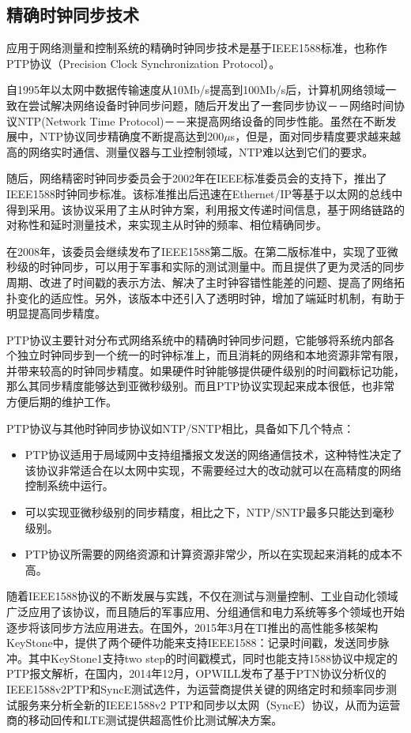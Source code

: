 \subsection{精确时钟同步技术}
应用于网络测量和控制系统的精确时钟同步技术是基于IEEE1588标准，也称作PTP协议（Precision Clock Synchronization Protocol）。

自1995年以太网中数据传输速度从10Mb/s提高到100Mb/s后，计算机网络领域一致在尝试解决网络设备时钟同步问题，随后开发出了一套同步协议－－网络时间协议NTP(Network Time Protocol)－－来提高网络设备的同步性能。虽然在不断发展中，NTP协议同步精确度不断提高达到200$\mu$s，但是，面对同步精度要求越来越高的网络实时通信、测量仪器与工业控制领域，NTP难以达到它们的要求。

随后，网络精密时钟同步委员会于2002年在IEEE标准委员会的支持下，推出了IEEE1588时钟同步标准。该标准推出后迅速在Ethernet/IP等基于以太网的总线中得到采用。该协议采用了主从时钟方案，利用报文传递时间信息，基于网络链路的对称性和延时测量技术，来实现主从时钟的频率、相位精确同步。

在2008年，该委员会继续发布了IEEE1588第二版。在第二版标准中，实现了亚微秒级的时钟同步，可以用于军事和实际的测试测量中。而且提供了更为灵活的同步周期、改进了时间戳的表示方法、解决了主时钟容错性能差的问题、提高了网络拓扑变化的适应性。另外，该版本中还引入了透明时钟，增加了端延时机制，有助于明显提高同步精度。

PTP协议主要针对分布式网络系统中的精确时钟同步问题，它能够将系统内部各个独立时钟同步到一个统一的时钟标准上，而且消耗的网络和本地资源非常有限，并带来较高的时钟同步精度。如果硬件时钟能够提供硬件级别的时间戳标记功能，那么其同步精度能够达到亚微秒级别。而且PTP协议实现起来成本很低，也非常方便后期的维护工作。

PTP协议与其他时钟同步协议如NTP/SNTP相比，具备如下几个特点\supercite{4}：
\begin{itemize}[noitemsep,topsep=0pt,parsep=0pt,partopsep=0pt]
	\item PTP协议适用于局域网中支持组播报文发送的网络通信技术，这种特性决定了该协议非常适合在以太网中实现，不需要经过大的改动就可以在高精度的网络控制系统中运行。
	\item 可以实现亚微秒级别的同步精度，相比之下，NTP/SNTP最多只能达到毫秒级别。
	\item PTP协议所需要的网络资源和计算资源非常少，所以在实现起来消耗的成本不高。
\end{itemize}

随着IEEE1588协议的不断发展与实践，不仅在测试与测量控制、工业自动化领域广泛应用了该协议，而且随后的军事应用、分组通信和电力系统等多个领域也开始逐步将该同步方法应用进去。在国外，2015年3月在TI推出的高性能多核架构KeyStone中\supercite{5}，提供了两个硬件功能来支持IEEE1588：记录时间戳，发送同步脉冲。其中KeyStone1支持two step的时间戳模式，同时也能支持1588协议中规定的PTP报文解析，在国内，2014年12月，OPWILL发布了基于PTN协议分析仪的IEEE1588v2PTP和SyncE测试选件，为运营商提供关键的网络定时和频率同步测试服务来分析全新的IEEE1588v2 PTP和同步以太网（SyncE）协议，从而为运营商的移动回传和LTE测试提供超高性价比测试解决方案。

